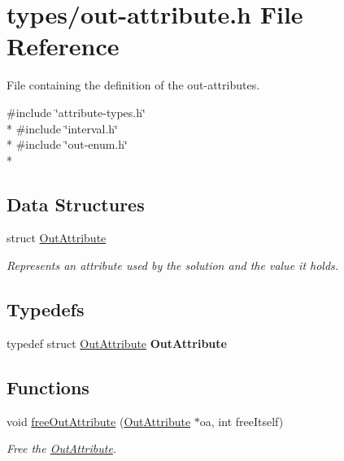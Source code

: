 \hypertarget{out-attribute_8h}{}\section{types/out-\/attribute.h File Reference}
\label{out-attribute_8h}


File containing the definition of the out-\/attributes.  


{\ttfamily \#include \char`\"{}attribute-\/types.\+h\char`\"{}}\\*
{\ttfamily \#include \char`\"{}interval.\+h\char`\"{}}\\*
{\ttfamily \#include \char`\"{}out-\/enum.\+h\char`\"{}}\\*
\subsection*{Data Structures}
\begin{DoxyCompactItemize}
\item 
struct \hyperlink{struct_out_attribute}{Out\+Attribute}
\begin{DoxyCompactList}\small\item\em Represents an attribute used by the solution and the value it holds. \end{DoxyCompactList}\end{DoxyCompactItemize}
\subsection*{Typedefs}
\begin{DoxyCompactItemize}
\item 
typedef struct \hyperlink{struct_out_attribute}{Out\+Attribute} {\bfseries Out\+Attribute}\hypertarget{out-attribute_8h_a9007e3a87ff7b2480410bafa15e4b40f}{}\label{out-attribute_8h_a9007e3a87ff7b2480410bafa15e4b40f}

\end{DoxyCompactItemize}
\subsection*{Functions}
\begin{DoxyCompactItemize}
\item 
void \hyperlink{out-attribute_8h_ae161fe222cc49ec48a76f7f77cf257ae}{free\+Out\+Attribute} (\hyperlink{struct_out_attribute}{Out\+Attribute} $\ast$oa, int free\+Itself)
\begin{DoxyCompactList}\small\item\em Free the \hyperlink{struct_out_attribute}{Out\+Attribute}. \end{DoxyCompactList}\end{DoxyCompactItemize}


